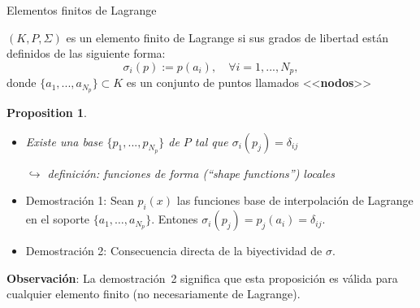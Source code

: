 \documentclass[10pt,leqno]{beamer}
\newcommand{\Np}{{N_p}}
\newtheorem{proposition}{Proposition}
\begin{document}
\begin{frame}{Elementos finitos de Lagrange}

  \begin{definition} $(K,P,\Sigma)$ es un \alert{elemento finito de
      Lagrange} si sus grados de libertad están definidos de las siguiente
    forma:
    $$
    \sigma_i(p) := p(a_i), \quad \forall i=1,...,\Np,
    $$
    donde $\{a_1,...,a_\Np\} \subset K$ es un conjunto de puntos
    llamados <<\textbf{nodos}>>
  \end{definition}

\begin{proposition}
  \begin{itemize}
  \item Existe una base $\{p_1,...,p_\Np\}$ de $P$ tal que
    $\sigma_i(p_j)=\delta_{ij}$
    \begin{flushright} \scriptsize $\hookrightarrow$  definición: funciones de forma
      (``\textit{shape functions}'') locales
    \end{flushright}
  \end{itemize}
\end{proposition}

  \begin{itemize}
  \item Demostración 1: Sean $p_i(x)$ las funciones base de
    interpolación de Lagrange en el soporte
    $\{a_1,\dots,a_\Np\}$. Entones
    $\sigma_i(p_j)=p_j(a_i)=\delta_{ij}$.
  \item Demostración 2: Consecuencia directa de la biyectividad de $\sigma$.
  \end{itemize}

  \textbf{Observación}: La demostración~2 significa que \alert{esta proposición es válida para
  cualquier elemento finito} (no necesariamente de Lagrange).
\end{frame}

{}
\end{document}
